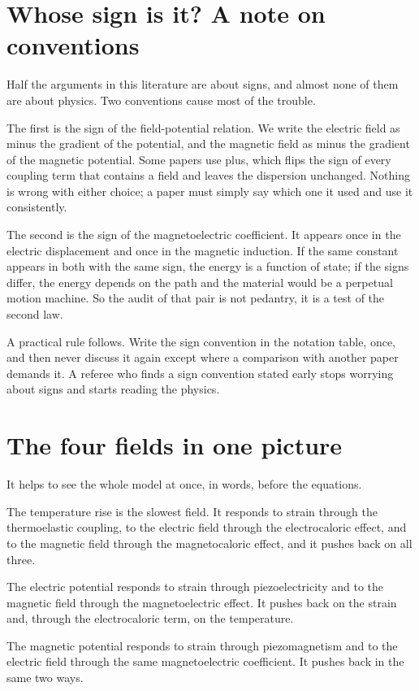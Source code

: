 \documentclass[11pt]{article}
\begin{document}
\section{Whose sign is it? A note on conventions}

Half the arguments in this literature are about signs, and almost none of them are about physics. Two
conventions cause most of the trouble.

The first is the sign of the field-potential relation. We write the electric field as minus the gradient of
the potential, and the magnetic field as minus the gradient of the magnetic potential. Some papers use plus,
which flips the sign of every coupling term that contains a field and leaves the dispersion unchanged. Nothing
is wrong with either choice; a paper must simply say which one it used and use it consistently.

The second is the sign of the magnetoelectric coefficient. It appears once in the electric displacement and
once in the magnetic induction. If the same constant appears in both with the same sign, the energy is a
function of state; if the signs differ, the energy depends on the path and the material would be a perpetual
motion machine. So the audit of that pair is not pedantry, it is a test of the second law.

A practical rule follows. Write the sign convention in the notation table, once, and then never discuss it
again except where a comparison with another paper demands it. A referee who finds a sign convention stated
early stops worrying about signs and starts reading the physics.

\section{The four fields in one picture}

It helps to see the whole model at once, in words, before the equations.

The temperature rise is the slowest field. It responds to strain through the thermoelastic coupling, to the
electric field through the electrocaloric effect, and to the magnetic field through the magnetocaloric effect,
and it pushes back on all three.

The electric potential responds to strain through piezoelectricity and to the magnetic field through the
magnetoelectric effect. It pushes back on the strain and, through the electrocaloric term, on the temperature.

The magnetic potential responds to strain through piezomagnetism and to the electric field through the same
magnetoelectric coefficient. It pushes back in the same two ways.
\end{document}

